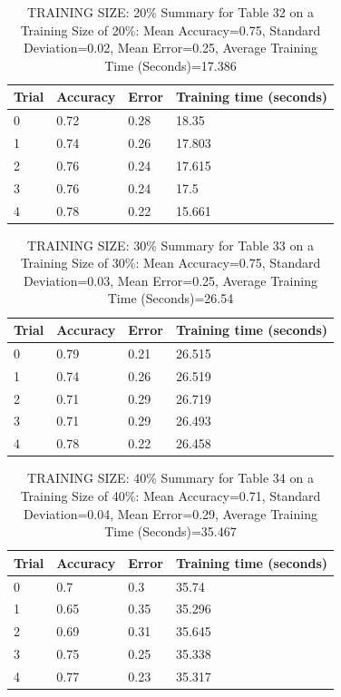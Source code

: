 \documentclass{article}
\begin{document}
\begin{table}[H]

\centering
{\begin{tabular}{||p{1cm}|p{1.8cm}|p{1.8cm}|p{3cm}||}
 \hline
Trial & Accuracy & Error & Training time (seconds) \\ [0.5ex] 
 \hline\hline
   0  & 0.72  & 0.28  & 18.35\\
\hline
   1  & 0.74  & 0.26  & 17.803\\
\hline
   2  & 0.76  & 0.24  & 17.615\\
\hline
   3  & 0.76  & 0.24  & 17.5\\
\hline
   4  & 0.78  & 0.22  & 15.661\\
\hline
\end{tabular}}
\caption{TRAINING SIZE: 20\% \newline Summary for Table 32 on a Training Size of 20\%: Mean Accuracy=0.75, Standard Deviation=0.02, Mean Error=0.25, Average Training Time (Seconds)=17.386}
\end{table} 

\begin{table}[H]

\centering
{\begin{tabular}{||p{1cm}|p{1.8cm}|p{1.8cm}|p{3cm}||}
 \hline
Trial & Accuracy & Error & Training time (seconds) \\ [0.5ex] 
 \hline\hline
   0  & 0.79  & 0.21  & 26.515\\
\hline
   1  & 0.74  & 0.26  & 26.519\\
\hline
   2  & 0.71  & 0.29  & 26.719\\
\hline
   3  & 0.71  & 0.29  & 26.493\\
\hline
   4  & 0.78  & 0.22  & 26.458\\
\hline
\end{tabular}}
\caption{TRAINING SIZE: 30\% \newline Summary for Table 33 on a Training Size of 30\%: Mean Accuracy=0.75, Standard Deviation=0.03, Mean Error=0.25, Average Training Time (Seconds)=26.54}
\end{table} 

\begin{table}[H]

\centering
{\begin{tabular}{||p{1cm}|p{1.8cm}|p{1.8cm}|p{3cm}||}
 \hline
Trial & Accuracy & Error & Training time (seconds) \\ [0.5ex] 
 \hline\hline
   0  & 0.7  & 0.3  & 35.74\\
\hline
   1  & 0.65  & 0.35  & 35.296\\
\hline
   2  & 0.69  & 0.31  & 35.645\\
\hline
   3  & 0.75  & 0.25  & 35.338\\
\hline
   4  & 0.77  & 0.23  & 35.317\\
\hline
\end{tabular}}
\caption{TRAINING SIZE: 40\% \newline Summary for Table 34 on a Training Size of 40\%: Mean Accuracy=0.71, Standard Deviation=0.04, Mean Error=0.29, Average Training Time (Seconds)=35.467}
\end{table} 
\end{document}
